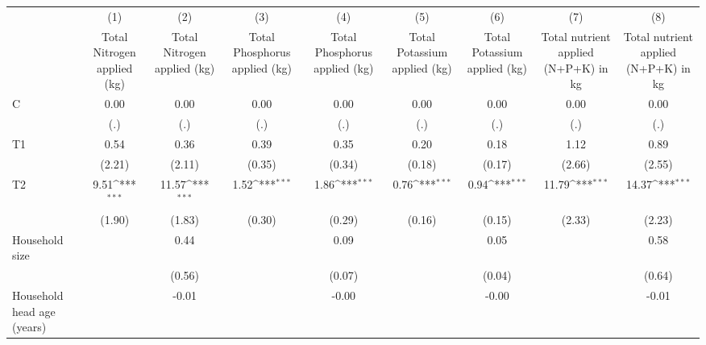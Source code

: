 {
\def\sym#1{\ifmmode^{#1}\else\(^{#1}\)\fi}
\begin{tabular}{l*{8}{c}}
\hline\hline
                &\multicolumn{1}{c}{(1)}&\multicolumn{1}{c}{(2)}&\multicolumn{1}{c}{(3)}&\multicolumn{1}{c}{(4)}&\multicolumn{1}{c}{(5)}&\multicolumn{1}{c}{(6)}&\multicolumn{1}{c}{(7)}&\multicolumn{1}{c}{(8)}\\
                &\multicolumn{1}{c}{Total Nitrogen applied (kg)}&\multicolumn{1}{c}{Total Nitrogen applied (kg)}&\multicolumn{1}{c}{Total Phosphorus applied (kg)}&\multicolumn{1}{c}{Total Phosphorus applied (kg)}&\multicolumn{1}{c}{Total Potassium applied (kg)}&\multicolumn{1}{c}{Total Potassium applied (kg)}&\multicolumn{1}{c}{Total nutrient applied (N+P+K) in kg}&\multicolumn{1}{c}{Total nutrient applied (N+P+K) in kg}\\
\hline
C               &     0.00         &     0.00         &     0.00         &     0.00         &     0.00         &     0.00         &     0.00         &     0.00         \\
                &      (.)         &      (.)         &      (.)         &      (.)         &      (.)         &      (.)         &      (.)         &      (.)         \\
T1              &     0.54         &     0.36         &     0.39         &     0.35         &     0.20         &     0.18         &     1.12         &     0.89         \\
                &   (2.21)         &   (2.11)         &   (0.35)         &   (0.34)         &   (0.18)         &   (0.17)         &   (2.66)         &   (2.55)         \\
T2              &     9.51\sym{***}&    11.57\sym{***}&     1.52\sym{***}&     1.86\sym{***}&     0.76\sym{***}&     0.94\sym{***}&    11.79\sym{***}&    14.37\sym{***}\\
                &   (1.90)         &   (1.83)         &   (0.30)         &   (0.29)         &   (0.16)         &   (0.15)         &   (2.33)         &   (2.23)         \\
Household size  &                  &     0.44         &                  &     0.09         &                  &     0.05         &                  &     0.58         \\
                &                  &   (0.56)         &                  &   (0.07)         &                  &   (0.04)         &                  &   (0.64)         \\
Household head age (years)&                  &    -0.01         &                  &    -0.00         &                  &    -0.00         &                  &    -0.01         \\

\end{tabular}}
